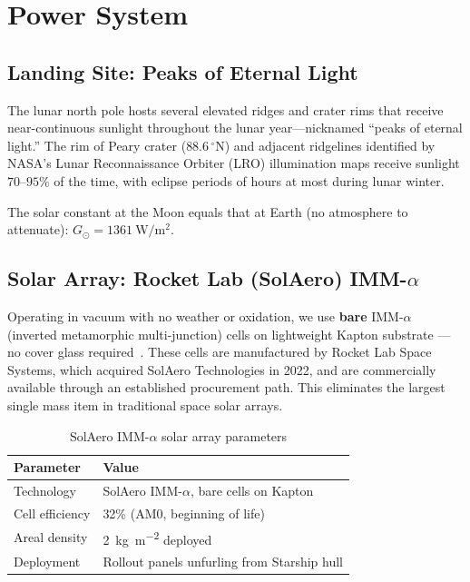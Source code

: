 \documentclass[10pt,letterpaper]{article}
\begin{document}
\section{Power System}

\subsection{Landing Site: Peaks of Eternal Light}

The lunar north pole hosts several elevated ridges and crater rims that receive
near-continuous sunlight throughout the lunar year---nicknamed ``peaks of
eternal light.'' The rim of Peary crater ($88.6\,^\circ$N) and adjacent
ridgelines identified by NASA's Lunar Reconnaissance Orbiter (LRO) illumination
maps receive sunlight $70$--$95\%$ of the time, with eclipse periods of hours
at most during lunar winter.

The solar constant at the Moon equals that at Earth (no atmosphere to
attenuate): $G_{\odot} = \SI{1361}{\watt\per\meter\squared}$.

\subsection{Solar Array: Rocket Lab (SolAero) IMM-\texorpdfstring{$\alpha$}{alpha}}

Operating in vacuum with no weather or oxidation, we use \textbf{bare}
IMM-$\alpha$ (inverted metamorphic multi-junction) cells on lightweight Kapton
substrate --- no cover glass required~\cite{SolAero}. These cells are
manufactured by Rocket Lab Space Systems, which acquired SolAero Technologies
in 2022, and are commercially available through an established procurement
path. This eliminates the largest single mass item in traditional space solar
arrays.

\begin{table}[!ht]
\centering\small
\caption{SolAero IMM-$\alpha$ solar array parameters}
\label{tab:solar-array}
\begin{tabularx}{\linewidth}{lX}
\toprule
\textbf{Parameter} & \textbf{Value} \\
\midrule
Technology & SolAero IMM-$\alpha$, bare cells on Kapton \\
Cell efficiency & 32\% (AM0, beginning of life) \\
Areal density & \SI{2}{\kilo\gram\per\meter\squared} deployed \\
Deployment & Rollout panels unfurling from Starship hull \\
\bottomrule
\end{tabularx}
\end{table}
\end{document}
